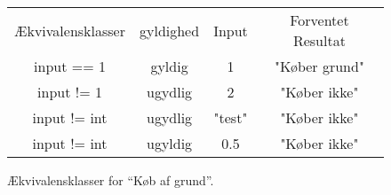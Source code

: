 \begin{figure}
\caption{Ækvivalensklasser for \enquote{Køb af grund}.}
\label{fig:EkviGrund}
\centering
\begin{tabular}{cccc}
Ækvivalensklasser & gyldighed & Input  & Forventet Resultat \\ 
input == 1 & gyldig & 1 & "Køber grund"\\ 
input != 1 & ugydlig & 2 & "Køber ikke"\\ 
input != int & ugydlig & "test" & "Køber ikke"\\
input != int & ugyldig & 0.5 & "Køber ikke" \\
\end{tabular} 
\end{figure}
